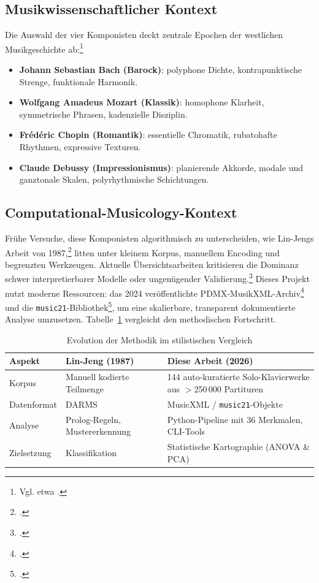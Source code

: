 \documentclass[12pt,a4paper]{article}
\theoremstyle{definition}
\begin{document}
\subsection{Musikwissenschaftlicher Kontext}
Die Auswahl der vier Komponisten deckt zentrale Epochen der westlichen Musikgeschichte ab:\footnote{Vgl. etwa \cite{DebussyCharacteristics,ChopinTransformations}.}
\begin{itemize}
    \item \textbf{Johann Sebastian Bach (Barock)}: polyphone Dichte, kontrapunktische Strenge, funktionale Harmonik.
    \item \textbf{Wolfgang Amadeus Mozart (Klassik)}: homophone Klarheit, symmetrische Phrasen, kadenzielle Disziplin.
    \item \textbf{Frédéric Chopin (Romantik)}: essentielle Chromatik, rubatohafte Rhythmen, expressive Texturen.
    \item \textbf{Claude Debussy (Impressionismus)}: planierende Akkorde, modale und ganztonale Skalen, polyrhythmische Schichtungen.
\end{itemize}

\subsection{Computational-Musicology-Kontext}
Frühe Versuche, diese Komponisten algorithmisch zu unterscheiden, wie Lin-Jengs Arbeit von 1987,\footnote{\cite{LinJeng1987}.} litten unter kleinem Korpus, manuellem Encoding und begrenzten Werkzeugen. Aktuelle Übersichtsarbeiten kritisieren die Dominanz schwer interpretierbarer Modelle oder ungenügender Validierung.\footnote{\cite{Simonetta2025}.} Dieses Projekt nutzt moderne Ressourcen: das 2024 veröffentlichte PDMX-MusikXML-Archiv\footnote{\cite{PDMX2024}.} und die \texttt{music21}-Bibliothek\footnote{\cite{Cuthbert2010}.}, um eine skalierbare, transparent dokumentierte Analyse umzusetzen. Tabelle~\ref{tab:evolution} vergleicht den methodischen Fortschritt.

\begin{table}[H]
    \centering
    \caption{Evolution der Methodik im stilistischen Vergleich}\label{tab:evolution}
    \begin{tabular}{p{3.2cm}p{5cm}p{6cm}}
                \toprule
        \textbf{Aspekt} & \textbf{Lin-Jeng (1987)} & \textbf{Diese Arbeit (2026)} \\
        \midrule
        Korpus & Manuell kodierte Teilmenge & 144 auto-kuratierte Solo-Klavierwerke aus $>$250\,000 Partituren \\
        Datenformat & DARMS & MusicXML / \texttt{music21}-Objekte \\
        Analyse & Prolog-Regeln, Mustererkennung & Python-Pipeline mit 36 Merkmalen, CLI-Tools \\
        Zielsetzung & Klassifikation & Statistische Kartographie (ANOVA \& PCA) \\
        \bottomrule
    \end{tabular}
\end{table}
\end{document}

